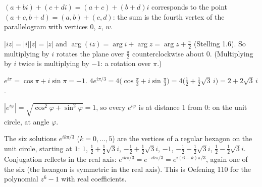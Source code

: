  $(a+bi)+(c+di)=(a+c)+(b+d)i$ corresponds to the point $(a+c,b+d)=(a,b)+(c,d)$: the sum is the fourth vertex of the parallelogram with vertices $0$, $z$, $w$.

 $|iz|=|i||z|=|z|$ and $\arg(iz)=\arg i+\arg z=\arg z+\frac\pi2$ (Stelling 1.6). So multiplying by $i$ rotates the plane over $\frac\pi2$ counterclockwise about $0$. (Multiplying by $i$ twice is multiplying by $-1$: a rotation over $\pi$.)

 $e^{i\pi}=\cos\pi+i\sin\pi=-1$. $4e^{i\pi/3}=4\big(\cos\frac\pi3+i\sin\frac\pi3\big)=4\big(\frac12+\frac12\sqrt3\,i\big)=2+2\sqrt3\,i$.

 $|e^{i\varphi}|=\sqrt{\cos^2\varphi+\sin^2\varphi}=1$, so every $e^{i\varphi}$ is at distance $1$ from $0$: on the unit circle, at angle $\varphi$.

 The six solutions $e^{ik\pi/3}$ ($k=0,\dots,5$) are the vertices of a regular hexagon on the unit circle, starting at $1$: $1$, $\frac12+\frac12\sqrt3i$, $-\frac12+\frac12\sqrt3i$, $-1$, $-\frac12-\frac12\sqrt3i$, $\frac12-\frac12\sqrt3i$. Conjugation reflects in the real axis: $\overline{e^{ik\pi/3}}=e^{-ik\pi/3}=e^{i(6-k)\pi/3}$, again one of the six (the hexagon is symmetric in the real axis). This is Oefening 110 for the polynomial $z^6-1$ with real coefficients.
